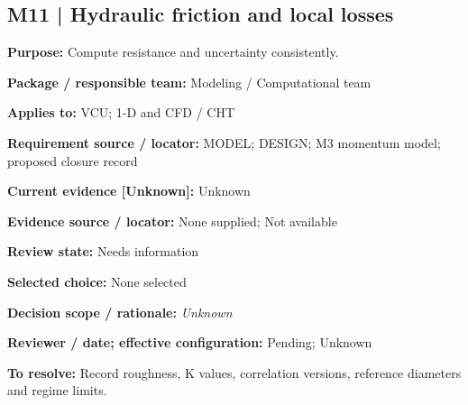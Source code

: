 \documentclass[11pt]{article}
\begin{document}
\par\noindent\begin{minipage}{\textwidth}\small\setlength{\parskip}{2pt}
\subsection*{M11 | Hydraulic friction and local losses}
\textbf{Purpose:} Compute resistance and uncertainty consistently.\par
\textbf{Package / responsible team:} Modeling / Computational team\par
\textbf{Applies to:} VCU; 1-D and CFD / CHT\par
\textbf{Requirement source / locator:} MODEL; DESIGN; M3 momentum model; proposed closure record\par
\textbf{Current evidence [Unknown]:} Unknown\par
\textbf{Evidence source / locator:} None supplied; Not available\par
\textbf{Review state:} Needs information\par
\textbf{Selected choice:} None selected\par
\textbf{Decision scope / rationale:} \textit{Unknown}\par
\textbf{Reviewer / date; effective configuration:} Pending; Unknown\par
\textbf{To resolve:} Record roughness, K values, correlation versions, reference diameters and regime limits.\par
\end{minipage}\par\vspace{5pt}
\end{document}

